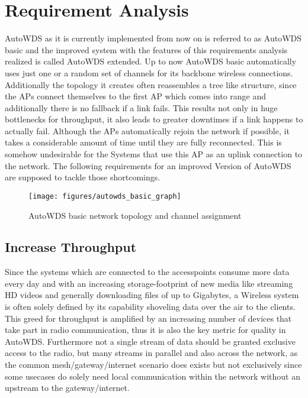 \chapter{Requirement Analysis}
  AutoWDS as it is currently implemented from now on is referred to as AutoWDS basic and the improved system with the features of this requirements analysis realized 
  is called AutoWDS extended.
  Up to now AutoWDS basic automatically uses just one or a random set of channels for its backbone wireless connections. 
  Additionally the topology it creates often reassembles a tree like structure, since the APs connect themselves 
  to the first AP which comes into range and additionally there is no fallback if a link fails. This results not only in huge bottlenecks for throughput,
  it also leads to greater downtimes if a link happens to actually fail. Although the APs automatically rejoin the network if possible, it takes
  a considerable amount of time until they are fully reconnected. This is somehow undesirable for the Systems that use this AP as an uplink connection to
  the network. The following requirements for an improved Version of AutoWDS are supposed to tackle those shortcomings.
  
  \begin{figure}[h!]
    \centering
    \texttt{[image: figures/autowds\_basic\_graph]}
    \caption{AutoWDS basic network topology and channel assignment}
    \label{fig:autowds_basic_graph}
  \end{figure}

  \section{Increase Throughput}
  Since the systems which are connected to the accesspoints consume more data every day and with an increasing storage-footprint of new media like streaming HD videos
  and generally downloading files of up to Gigabytes, a Wireless system is often solely defined by its capability shoveling data over the air to the clients.
  This greed for throughput is amplified by an increasing number of devices that take part in radio communication, 
  thus it is also the key metric for quality in AutoWDS. Furthermore not a single stream of data should be granted exclusive access to the radio, but
  many streams in parallel and also across the network, as the common mesh/gateway/internet scenario does exists but not exclusively since
  some usecases do solely need local communication within the network without an upstream to the gateway/internet.
  
